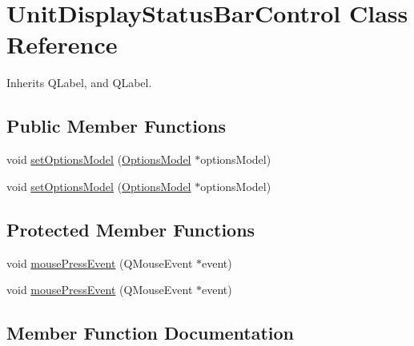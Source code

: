 \hypertarget{class_unit_display_status_bar_control}{}\section{Unit\+Display\+Status\+Bar\+Control Class Reference}
\label{class_unit_display_status_bar_control}


Inherits Q\+Label, and Q\+Label.

\subsection*{Public Member Functions}
\begin{DoxyCompactItemize}
\item 
void \mbox{\hyperlink{class_unit_display_status_bar_control_ac8d2a43f66f3f71c7d6926dbd5927066}{set\+Options\+Model}} (\mbox{\hyperlink{class_options_model}{Options\+Model}} $\ast$options\+Model)
\item 
void \mbox{\hyperlink{class_unit_display_status_bar_control_ac8d2a43f66f3f71c7d6926dbd5927066}{set\+Options\+Model}} (\mbox{\hyperlink{class_options_model}{Options\+Model}} $\ast$options\+Model)
\end{DoxyCompactItemize}
\subsection*{Protected Member Functions}
\begin{DoxyCompactItemize}
\item 
void \mbox{\hyperlink{class_unit_display_status_bar_control_a645cb0f2a435881ca9cc5ac09355cff0}{mouse\+Press\+Event}} (Q\+Mouse\+Event $\ast$event)
\item 
void \mbox{\hyperlink{class_unit_display_status_bar_control_a645cb0f2a435881ca9cc5ac09355cff0}{mouse\+Press\+Event}} (Q\+Mouse\+Event $\ast$event)
\end{DoxyCompactItemize}


\subsection{Member Function Documentation}
\mbox{\label{class_unit_display_status_bar_control_a645cb0f2a435881ca9cc5ac09355cff0}} 
